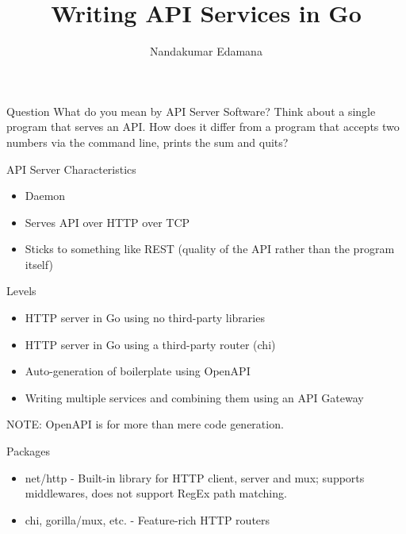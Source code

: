 \documentclass{beamer}
\begin{document}
\title{Writing API Services in Go}
\author{Nandakumar Edamana}

\maketitle

\begin{frame}[fragile]{Question}
What do you mean by API Server Software? Think about a single program that
serves an API. How does it differ from a program that accepts two numbers
via the command line, prints the sum and quits?
\end{frame}

\begin{frame}[fragile]{API Server Characteristics}
\begin{itemize}
  \pause \item Daemon
  \pause \item Serves API over HTTP over TCP
  \pause \item Sticks to something like REST (quality of the API rather than
               the program itself)
\end{itemize}
\end{frame}

\begin{frame}[fragile]{Levels}
\begin{itemize}
  \item HTTP server in Go using no third-party libraries
  \item HTTP server in Go using a third-party router (chi)
  \item Auto-generation of boilerplate using OpenAPI
  \item Writing multiple services and combining them using an API Gateway
\end{itemize}

NOTE: OpenAPI is for more than mere code generation.

\end{frame}

\begin{frame}[fragile]{Packages}
\begin{itemize}
  \item net/http - Built-in library for HTTP client, server and mux; supports middlewares, does not support RegEx path matching.
  \item chi, gorilla/mux, etc. - Feature-rich HTTP routers
\end{itemize}
\end{frame}
\end{document}
